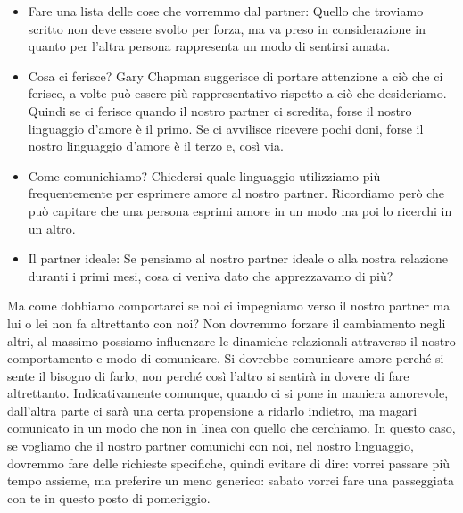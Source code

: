 \documentclass[12pt]{book} %
\begin{document}
\begin{itemize}
\item Fare una lista delle cose che vorremmo dal partner: Quello che troviamo scritto non deve essere svolto per forza,
ma va preso in considerazione in quanto per l'altra persona rappresenta un modo di sentirsi amata.
\item Cosa ci ferisce? Gary Chapman suggerisce di portare attenzione a ciò che ci ferisce, a volte può essere più
rappresentativo rispetto a ciò che desideriamo. Quindi se ci ferisce quando il nostro partner ci scredita, forse il
nostro linguaggio d'amore è il primo. Se ci avvilisce ricevere pochi doni, forse il nostro linguaggio d'amore è il
terzo e, così via.
\item Come comunichiamo? Chiedersi quale linguaggio utilizziamo più frequentemente per esprimere amore al nostro
partner. Ricordiamo però che può capitare che una persona esprimi amore in un modo ma poi lo ricerchi in un altro.
\item Il partner ideale: Se pensiamo al nostro partner ideale o alla nostra relazione duranti i primi mesi, cosa ci
veniva dato che apprezzavamo di più?
\end{itemize}

Ma come dobbiamo comportarci se noi ci impegniamo verso il nostro partner ma lui o lei non fa altrettanto con noi?
Non dovremmo forzare il cambiamento negli altri, al massimo possiamo influenzare le dinamiche relazionali attraverso il nostro comportamento e modo di comunicare.
Si dovrebbe comunicare amore perché
si sente il bisogno di farlo, non perché così l'altro si sentirà in dovere di fare altrettanto.
Indicativamente comunque, quando ci si pone in maniera amorevole, dall'altra parte ci sarà una certa propensione a
ridarlo indietro, ma magari comunicato in un modo che non in linea con quello che cerchiamo. In questo caso, se vogliamo
che il nostro partner comunichi con noi, nel nostro linguaggio, dovremmo fare delle richieste specifiche, quindi evitare
di dire: vorrei passare più tempo assieme, ma preferire un meno generico: sabato vorrei fare una passeggiata con te in
questo posto di pomeriggio.
\end{document}
